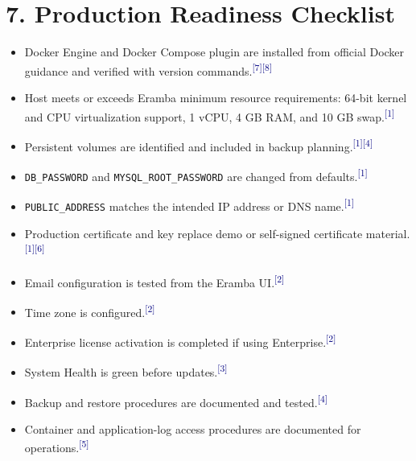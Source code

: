 \documentclass[10pt,letterpaper]{article}
\newcommand{\source}[1]{\textsuperscript{\textcolor{navy}{#1}}}
\begin{document}
\section{7. Production Readiness Checklist}
\begin{itemize}
  \item Docker Engine and Docker Compose plugin are installed from official Docker guidance and verified with version commands.\source{[7]}\source{[8]}
  \item Host meets or exceeds Eramba minimum resource requirements: 64-bit kernel and CPU virtualization support, 1 vCPU, 4 GB RAM, and 10 GB swap.\source{[1]}
  \item Persistent volumes are identified and included in backup planning.\source{[1]}\source{[4]}
  \item \texttt{DB\_PASSWORD} and \texttt{MYSQL\_ROOT\_PASSWORD} are changed from defaults.\source{[1]}
  \item \texttt{PUBLIC\_ADDRESS} matches the intended IP address or DNS name.\source{[1]}
  \item Production certificate and key replace demo or self-signed certificate material.\source{[1]}\source{[6]}
  \item Email configuration is tested from the Eramba UI.\source{[2]}
  \item Time zone is configured.\source{[2]}
  \item Enterprise license activation is completed if using Enterprise.\source{[2]}
  \item System Health is green before updates.\source{[3]}
  \item Backup and restore procedures are documented and tested.\source{[4]}
  \item Container and application-log access procedures are documented for operations.\source{[5]}
\end{itemize}
\end{document}
